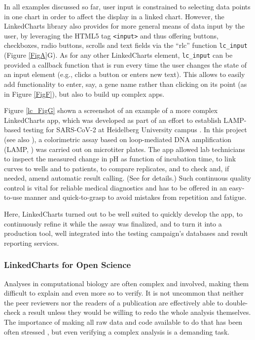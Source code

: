 \documentclass[twocolumn,10pt]{article}
\begin{document}
In all examples discussed so far, user input is constrained to selecting data points in one chart in order to affect the display in a linked chart. However, the LinkedCharts library also provides for more general means of data input by the user, by leveraging the HTML5 tag \texttt{<input>} and thus offering buttons, checkboxes, radio buttons, scrolls and text fields via the ``rlc'' function \texttt{lc_input} (Figure \ref{FigA}G). As for any other LinkedCharts element, \texttt{lc_input} can be provided a callback function that is run every time the user changes the state of an input element (e.g., clicks a button or enters new text). This allows to easily add functionality to enter, say, a gene name rather than clicking on its point (as in Figure \ref{FigF}), but also to build up complex apps.

Figure \ref{lc_FigG} shown a screenshot of an example of a more complex LinkedCharts app, which was developed as part of an effort to establish LAMP-based testing for SARS-CoV-2 at Heidelberg University campus \citep{daothi_2020}. In this project (see also \citep{herbst_2021}), a colorimetric assay based on loop-mediated DNA amplification (LAMP, \citep{notomi_2000}) was carried out on microtiter plates. The app allowed
lab technicians to inspect the measured change in pH as function of incubation time, to link curves to wells and to patients, to compare replicates, and to check and, if needed, amend automatic result calling. (See \citet{deckert_2021} for details.) Such continuous quality control is vital for reliable medical diagnostics and has to be offered in an easy-to-use manner and quick-to-grasp to avoid mistakes from repetition and fatigue.

Here, LinkedCharts turned out to be well suited to quickly develop the app, to continuously refine it while the assay was finalized, and to turn it into a production tool, well integrated into the testing campaign's databases and result reporting services.

\subsubsection{LinkedCharts for Open Science}

Analyses in computational biology are often complex and involved, making them difficult to explain and even more so to verify. It is not uncommon that neither the peer reviewers nor the readers of a publication are effectively able to double-check a result unless they would be willing to redo the whole analysis themselves. The importance of making all raw data and code available to do that has been often stressed \citep{gentleman_2005}, but even verifying a complex analysis is a demanding task.
\end{document}
